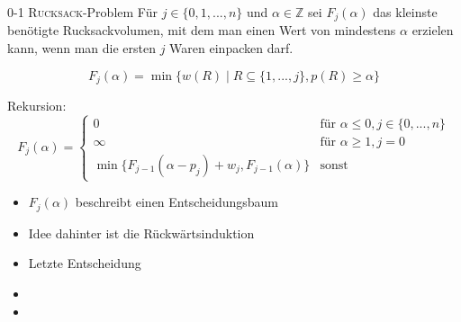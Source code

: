 \begin{frame}{0-1 \textsc{Rucksack}-Problem}
    Für $j \in \{0,1,...,n\}$ und $\alpha \in \mathbb{Z}$ sei $F_j(\alpha)$ das kleinste benötigte Rucksackvolumen, mit dem
    man einen Wert von mindestens $\alpha$ erzielen kann, wenn man die ersten $j$ Waren einpacken darf. 
    
    \begin{equation*}
        F_j(\alpha) = \min\{w(R) \mid R \subseteq \{1,...,j\}, p(R) \geq \alpha  \}
    \end{equation*}
    
    Rekursion:
    \begin{equation*}
        F_j(\alpha) = \begin{cases}
        0 & \text{für } \alpha\leq 0, j \in \{0,...,n \} \\
        \infty & \text{für } \alpha\geq 1, j = 0 \\
        \min\{F_{j-1}(\alpha-p_j) + w_j, F_{j-1}(\alpha) \} & \text{sonst}
        \end{cases}       
    \end{equation*}
\end{frame}

\begin{frame}
    \begin{itemize}
        \item $F_j(\alpha)$ beschreibt einen Entscheidungsbaum
        \item Idee dahinter ist die Rückwärtsinduktion
        \item Letzte Entscheidung 
        \item 
        \item 
    \end{itemize}
\end{frame}

